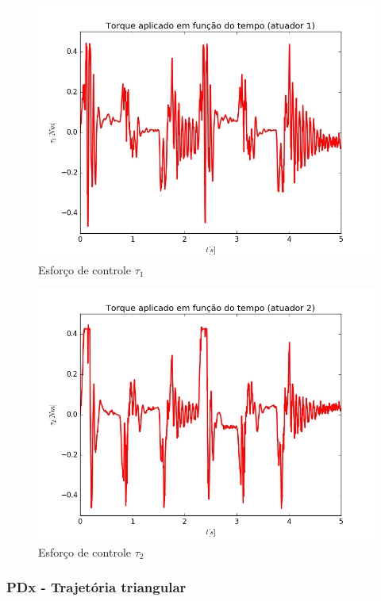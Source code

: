 \documentclass[]{politex}
\begin{document}
\begin{multicols}{2}
\begin{figure}[H]
	\centering
	\includegraphics[scale=0.39]{../../../Experimental/Aquisicoes/SMCt_triangulo/tau1.png}  
	\caption{Esforço de controle $\tau_1$}
	\label{fig:SMCq_triangulo_tau1}
\end{figure}
\begin{figure}[H]
	\centering
	\includegraphics[scale=0.39]{../../../Experimental/Aquisicoes/SMCt_triangulo/tau2.png}  
	\caption{Esforço de controle $\tau_2$}
	\label{fig:SMCq_triangulo_tau2}
\end{figure}
\end{multicols}


\subsubsection{PDx - Trajetória triangular}
\end{document}
